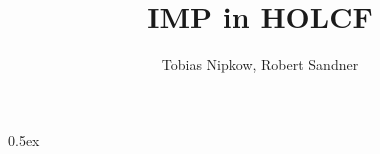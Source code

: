 \documentclass[11pt,a4paper]{article}
\begin{document}
\title{IMP in HOLCF}
\author{Tobias Nipkow, Robert Sandner}
\maketitle

\tableofcontents

\parindent 0pt\parskip 0.5ex





\end{document}
